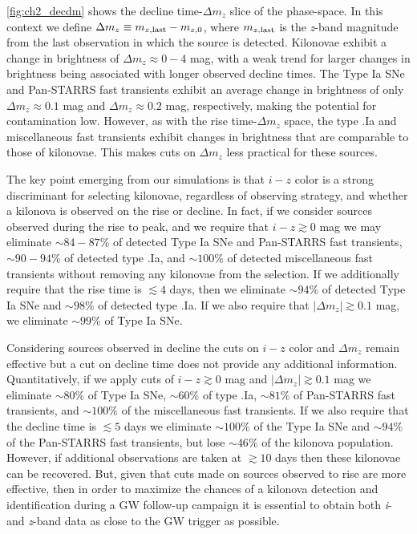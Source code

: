 \autoref{fig:ch2_decdm} shows the decline time-$\Delta m_z$ slice of the phase-space. In this context we define $\Delta m_z \equiv m_{z,{\rm last}} - m_{z,{\rm 0}}$, where $m_{z,{\rm last}}$ is the {\em z}-band magnitude from the last observation in which the source is detected. Kilonovae exhibit a change in brightness of $\Delta m_z \approx 0 - 4$ mag, with a weak trend for larger changes in brightness being associated with longer observed decline times. The Type Ia SNe and Pan-STARRS fast transients exhibit an average change in brightness of only $\Delta m_z \approx 0.1$ mag and $\Delta m_z \approx 0.2$ mag, respectively, making the potential for contamination low. However, as with the rise time-$\Delta m_z$ space, the type .Ia and miscellaneous fast transients exhibit changes in brightness that are comparable to those of kilonovae. This makes cuts on $\Delta m_z$ less practical for these sources.

The key point emerging from our simulations is that $i-z$ color is a strong discriminant for selecting kilonovae, regardless of observing strategy, and whether a kilonova is observed on the rise or decline. In fact, if we consider sources observed during the rise to peak, and we require that $i-z\gtrsim0$ mag we may eliminate $\sim84-87\%$ of detected Type Ia SNe and Pan-STARRS fast transients, $\sim90-94\%$ of detected type .Ia, and $\sim100\%$ of detected miscellaneous fast transients without removing any kilonovae from the selection. If we additionally require that the rise time is $\lesssim4$ days, then we eliminate $\sim94\%$ of detected Type Ia SNe and $\sim98\%$ of detected type .Ia. If we also require that $|\Delta m_z| \gtrsim 0.1$ mag, we eliminate $\sim99\%$ of Type Ia SNe.

Considering sources observed in decline the cuts on $i-z$ color and $\Delta m_z$ remain effective but a cut on decline time does not provide any additional information. Quantitatively, if we apply cuts of $i-z \gtrsim 0$ mag and $|\Delta m_z| \gtrsim 0.1$ mag we eliminate $\sim80\%$ of Type Ia SNe, $\sim60\%$ of type .Ia, $\sim81\%$ of Pan-STARRS fast transients, and $\sim 100\%$ of the miscellaneous fast transients. If we also require that the decline time is $\lesssim 5$ days we eliminate $\sim 100\%$ of the Type Ia SNe and $\sim94\%$ of the Pan-STARRS fast transients, but lose $\sim46\%$ of the kilonova population. However, if additional observations are taken at $\gtrsim10$ days then these kilonovae can be recovered. But, given that cuts made on sources observed to rise are more effective, then in order to maximize the chances of a kilonova detection and identification during a GW follow-up campaign it is essential to obtain both {\em i}- and {\em z}-band data as close to the GW trigger as possible.

